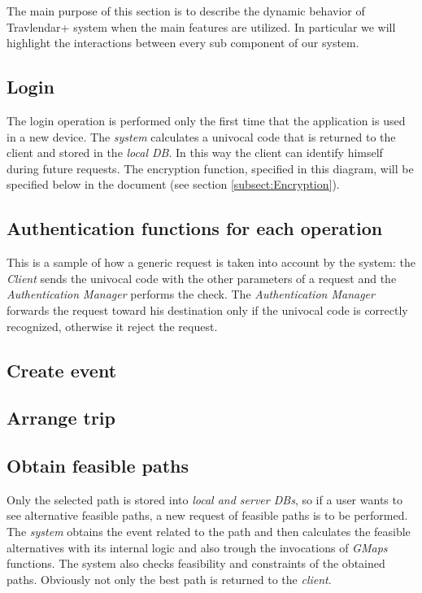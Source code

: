The main purpose of this section is to describe the dynamic behavior of Travlendar+ system when the main features are utilized. In particular we will highlight the interactions between every sub component of our system.
\subsection{Login}
			\noindent{}
			The login operation is performed only the first time that the application is used in a new device. 
			The \textit{system} calculates a univocal code that is returned to the client and stored in the \textit{local DB}. In this way the client can identify himself during future requests. 
			The encryption function, specified in this diagram, will be specified below in the document (see section \ref{subsect:Encryption}).
\subsection{Authentication functions for each operation}
		\noindent{}
		This is a sample of how a generic request is taken into account by the system: the \textit{Client} sends the univocal code with the other parameters of a request and the \textit{Authentication Manager} performs the check. 
		The \textit{Authentication Manager} forwards the request toward his destination only if the univocal code is correctly recognized, otherwise it reject the request.
\subsection{Create event}
		\noindent{}
\subsection{Arrange trip}
		\noindent{}
\subsection{Obtain feasible paths}
		\noindent{}
		Only the selected path is stored into \textit{local and server DBs}, so if a user wants to see alternative feasible paths, a new request of feasible paths is to be performed. 
		The \textit{system} obtains the event related to the path and then calculates the feasible alternatives with its internal logic and also trough the invocations of \textit{GMaps} functions. The system also checks feasibility and constraints of the obtained paths. Obviously not only the best path is returned to the \textit{client}.
